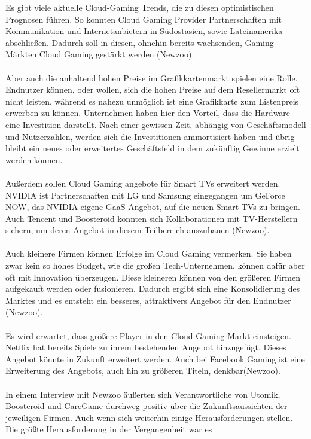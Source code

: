 \documentclass[12pt,toc=bib,toc=listof]{scrreprt}
\begin{document}
Es gibt viele aktuelle Cloud-Gaming Trends, die zu diesen optimistischen Prognosen führen. So konnten Cloud Gaming Provider 
Partnerschaften mit Kommunikation und Internetanbietern in Südostasien, sowie Lateinamerika abschließen. Dadurch soll in diesen, 
ohnehin bereits wachsenden, Gaming Märkten Cloud Gaming gestärkt werden (Newzoo). 
\\ \\
Aber auch die anhaltend hohen Preise im Grafikkartenmarkt
spielen eine Rolle. Endnutzer können, oder wollen, sich die hohen Preise auf dem Resellermarkt oft nicht leisten, während es nahezu 
unmöglich ist eine Grafikkarte zum Listenpreis erwerben zu können. Unternehmen haben hier den Vorteil, dass die Hardware eine Investition darstellt.
Nach einer gewissen Zeit, abhängig von Geschäftsmodell und Nutzerzahlen, werden sich die Investitionen ammortisiert haben und übrig 
bleibt ein neues oder erweitertes Geschäftsfeld in dem zukünftig Gewinne erzielt werden können.
\\ \\
Außerdem sollen Cloud Gaming angebote für Smart TVs erweitert werden. NVIDIA ist Partnerschaften mit LG und Samsung eingegangen 
um GeForce NOW, das NVIDIA eigene GaaS Angebot, auf die neuen Smart TVs zu bringen. Auch Tencent und Boosteroid konnten sich 
Kollaborationen mit TV-Herstellern sichern, um deren Angebot in diesem Teilbereich auszubauen (Newzoo).
\\ \\
Auch kleinere Firmen können Erfolge im Cloud Gaming vermerken. Sie haben zwar kein so hohes Budget, wie die großen Tech-Unternehmen,
können dafür aber oft mit Innovation überzeugen. Diese kleineren können von den größeren Firmen aufgekauft werden oder fusionieren.
Dadurch ergibt sich eine Konsolidierung des Marktes und es entsteht ein besseres, attraktivers Angebot für den Endnutzer (Newzoo).
\\ \\
Es wird erwartet, dass größere Player in den Cloud Gaming Markt einsteigen. Netflix hat bereits Spiele zu ihrem bestehenden Angebot
hinzugefügt. Dieses Angebot könnte in Zukunft erweitert werden. Auch bei Facebook Gaming ist eine Erweiterung des Angebots, auch hin zu
größeren Titeln, denkbar(Newzoo).
\\ \\
In einem Interview mit Newzoo äußerten sich Verantwortliche von Utomik, Boosteroid und CareGame durchweg positiv über die Zukunftsaussichten
der jeweiligen Firmen. Auch wenn sich weiterhin einige Herausforderungen stellen. Die größte Herausforderung in der Vergangenheit war es 
\end{document}
